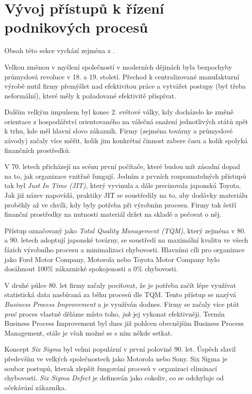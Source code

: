 \section{Vývoj přístupů k řízení podnikových procesů}
Obsah této sekce vychází zejména z \cite{Panagacos2012}.

Velkou změnou v myšlení společností v moderních dějinách byla bezpochyby průmyslová revoluce v 18. a 19. století. Přechod k centralizované manufakturní výrobě nutil firmy přemýšlet nad efektivitou práce a vytvářet postupy (byť třeba neformální), které měly k požadované efektivitě přispívat.

Dalším velkým impulsem byl konec 2. světové války, kdy docházelo ke změně orientace z hospodářství orientovaného na válečná snažení jednotlivých států zpět k trhu, kde měl hlavní slovo zákazník. Firmy (zejména továrny a průmyslové závody) začaly více měřit, kolik jim konkrétní činnost zabere času a kolik spolyká finančních prostředků.

V 70. letech přicházejí na scénu první počítače, které budou mít zásadní dopad na to, jak organizace vnitřně fungují. Jedním z prvních rozpoznatelných přístupů tak byl \textit{Just In Time (JIT)}, který vyvinula a dále precizovala japonská Toyota. Jak již název napovídá, praktiky JIT se soustředily na to, aby dodávky materiálu proběhly až ve chvíli, kdy byly potřeba při výrobním procesu. Firmy tak šetří finanční prostředky na nutnosti materiál držet na skladě a pečovat o něj. 

Přístup označovaný jako \textit{Total Quality Management (TQM)}, který zejména v 80. a 90. letech adoptují japonské továrny, se soustředí na maximální kvalitu ve všech fázích výrobního procesu a minimalizaci chybovosti. Hlavními cíli pro organizace jako Ford Motor Company, Motorola nebo Toyota Motor Company bylo dosáhnout 100\% zákaznické spokojenosti a 0\% chybovosti.

V druhé půlce 80. let firmy začaly pociťovat, že je potřeba začít lépe využívat statistická data nasbíraná za běhu procesů dle TQM. Tento přístup se nazývá \textit{Business Process Improvement} a je využíván dodnes. Firmy se začaly více ptát \textit{proč} proces vlastně děláme místo toho, \textit{jak} jej vykonat efektivněji. Termín Business Process Improvement byl dnes již pohlcen obecnějším Business Process Management, stále je však možné se s ním někde setkat.

Koncept \textit{Six Sigma} byl velmi populární v první polovině 90. let. Úspěch slavil především ve velkých společnostech jako Motorola nebo Sony. Six Sigma je soubor postupů, kterak zlepšit fungování procesů v organizaci eliminací chybovosti. \textit{Six Sigma Defect} je definován jako cokoliv, co se odchyluje od očekávání zákazníka.

